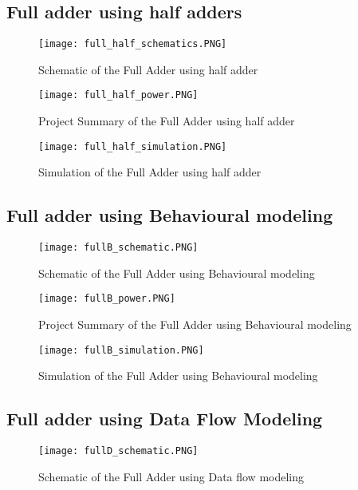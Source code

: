 \clearpage
\subsection{Full adder using half adders }
\begin{figure}[h!]
\centering
\texttt{[image: full\_half\_schematics.PNG]}
\caption{Schematic of the Full Adder using half adder}
\label{figure:1}
\end{figure}


\begin{figure}[h!]
\centering
\texttt{[image: full\_half\_power.PNG]}
\caption{Project Summary of the Full Adder using half adder}
\label{figure:2}


\end{figure}


\begin{figure}[h!]
\centering
\texttt{[image: full\_half\_simulation.PNG]}
\caption{Simulation of the Full Adder using half adder}
\label{figure:3}
\end{figure}


\FloatBarrier   \clearpage

\subsection{Full adder using Behavioural modeling }
\begin{figure}[h!]
\centering
\texttt{[image: fullB\_schematic.PNG]}
\caption{Schematic of the Full Adder using Behavioural modeling}
\label{figure:1}
\end{figure}



\begin{figure}[h!]
\centering
\texttt{[image: fullB\_power.PNG]}
\caption{Project Summary of the Full Adder using Behavioural modeling}
\label{figure:2}


\end{figure}


\begin{figure}[h!]
\centering
\texttt{[image: fullB\_simulation.PNG]}
\caption{Simulation of the Full Adder using Behavioural modeling}
\label{figure:3}
\end{figure}


\FloatBarrier   \clearpage

\subsection{Full adder using Data Flow Modeling }
\begin{figure}[h!]
\centering
\texttt{[image: fullD\_schematic.PNG]}
\caption{Schematic of the Full Adder using Data flow modeling}
\label{figure:1}
\end{figure}



